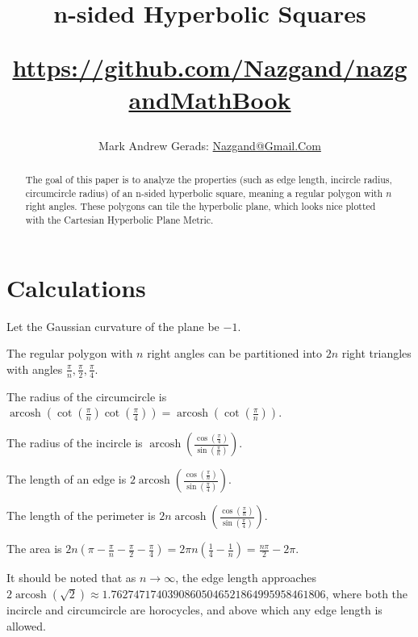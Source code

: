 \documentclass[]{article}
\author{Mark Andrew Gerads: \href{MailTo:Nazgand@Gmail.Com}{Nazgand@Gmail.Com}}
\title{
	n-sided Hyperbolic Squares
	
	\href{https://github.com/Nazgand/nazgandMathBook}{https://github.com/Nazgand/nazgandMathBook}
}
\DeclareMathOperator{\arcosh}{arcosh}
\newcommand{\pqty}[1]{{\left(#1\right)}}
\numberwithin{equation}{section}
\begin{document}
	
	\maketitle
	
	\begin{abstract}
		The goal of this paper is to analyze the properties (such as edge length, incircle radius, circumcircle radius) of an n-sided hyperbolic square, meaning a regular polygon with $n$ right angles. These polygons can tile the hyperbolic plane, which looks nice plotted with the Cartesian Hyperbolic Plane Metric.
	\end{abstract}
	
	\section{Calculations}
	Let the Gaussian curvature of the plane be $-1$.
	
	The regular polygon with $n$ right angles can be partitioned into $2n$ right triangles with angles $\frac{\pi}{n},\frac{\pi}{2},\frac{\pi}{4}$.
	
	The radius of the circumcircle is $\arcosh\pqty{\cot\pqty{\frac{\pi}{n}}\cot\pqty{\frac{\pi}{4}}}=\arcosh\pqty{\cot\pqty{\frac{\pi}{n}}}$.
	
	The radius of the incircle is
	$\arcosh\pqty{\frac{\cos\pqty{\frac{\pi}{4}}}{\sin\pqty{\frac{\pi}{n}}}}$.
	
	The length of an edge is
	$2\arcosh\pqty{\frac{\cos\pqty{\frac{\pi}{n}}}{\sin\pqty{\frac{\pi}{4}}}}$.
	
	The length of the perimeter is
	$2n\arcosh\pqty{\frac{\cos\pqty{\frac{\pi}{n}}}{\sin\pqty{\frac{\pi}{4}}}}$.
	
	The area is
	$2n\pqty{\pi-\frac{\pi}{n}-\frac{\pi}{2}-\frac{\pi}{4}}=
	2\pi n\pqty{\frac{1}{4}-\frac{1}{n}}=
	\frac{n\pi}{2}-2\pi$.
	
	It should be noted that as $n\to\infty$, the edge length approaches
	$2\arcosh\pqty{\sqrt{2}}\approx 1.76274717403908605046521864995958461806$, where both the incircle and circumcircle are horocycles, and above which any edge length is allowed.
	
\end{document}
